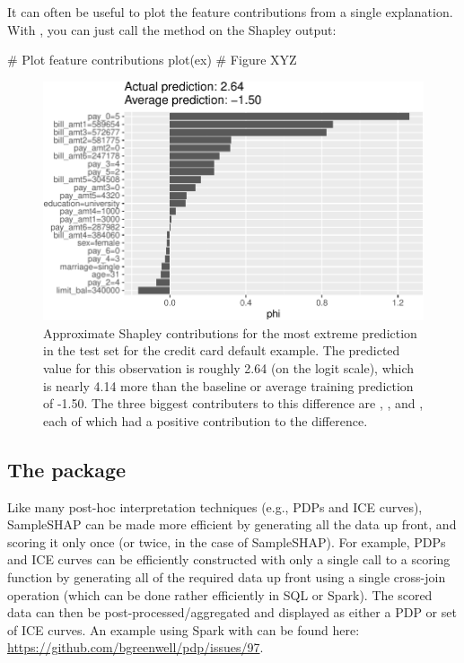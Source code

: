 It can often be useful to plot the feature contributions from a single
explanation. With , you can just call the  method
on the Shapley output:

\begin{Schunk}
\begin{Sinput}
# Plot feature contributions
plot(ex)  # Figure XYZ
\end{Sinput}
\begin{figure}[!htb]

{\centering \includegraphics[width=1\linewidth]{greenwell_files/figure-latex/ex-credit-gbm-predict-extreme-explain-plot-1} 

}

\caption[Approximate Shapley contributions for the most extreme prediction in the test set for the credit card default example]{Approximate Shapley contributions for the most extreme prediction in the test set for the credit card default example. The predicted value for this observation is roughly 2.64 (on the logit scale), which is nearly 4.14 more than the baseline or average training prediction of -1.50. The three biggest contributers to this difference are , , and , each of which had a positive contribution to the difference.}\label{fig:ex-credit-gbm-predict-extreme-explain-plot}
\end{figure}
\end{Schunk}

\subsection{The  package \label{sec:fastshap}}

Like many post-hoc interpretation techniques (e.g., PDPs and ICE
curves), SampleSHAP can be made more efficient by generating all the
data up front, and scoring it only once (or twice, in the case of
SampleSHAP). For example, PDPs and ICE curves can be efficiently
constructed with only a single call to a scoring function by generating
all of the required data up front using a single cross-join operation
(which can be done rather efficiently in SQL or Spark). The scored data
can then be post-processed/aggregated and displayed as either a PDP or
set of ICE curves. An example using Spark with 
\citet{R-sparklyr} can be found here:
\url{https://github.com/bgreenwell/pdp/issues/97}.

